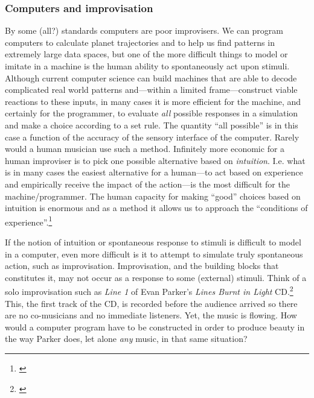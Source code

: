 \subsubsection*{Computers and improvisation}
\label{sec:comp-as-impr}

By some (all?) standards computers are poor improvisers. We can
program computers to calculate planet trajectories and to help us find
patterns in extremely large data spaces, but one of the more difficult
things to model or imitate in a machine is the human ability to
spontaneously act upon stimuli. Although current computer science can
build machines that are able to decode complicated real world patterns
and---within a limited frame---construct viable reactions to these
inputs, in many cases it is more efficient for the machine, and
certainly for the programmer, to evaluate \emph{all} possible
responses in a simulation and make a choice according to a set
rule. The quantity ``all possible'' is in this case a function of the
accuracy of the sensory interface of the computer. Rarely would a
human musician use such a method. Infinitely more economic for a human
improviser is to pick one possible alternative based on
\emph{intuition}. I.e. what is in many cases the easiest alternative
for a human---to act based on experience and empirically receive the
impact of the action---is the most difficult for the
machine/programmer. The human capacity for making ``good'' choices
based on intuition is enormous and as a method it allows us to
approach the ``conditions of experience''.\footnote{\citet[p. 27]{deleuze88}}

If the notion of intuition or spontaneous response to stimuli is
difficult to model in a computer, even more difficult is it to attempt
to simulate truly spontaneous action, such as
improvisation. Improvisation, and the building blocks that constitutes
it, may not occur as a response to some (external) stimuli. Think of a
solo improvisation such as \emph{Line 1} of Evan Parker's
\emph{Lines Burnt in Light} CD.\footnote{\citet{parker01}} This, the first
track of the CD, is recorded before the audience arrived so there are
no co-musicians and no immediate listeners. Yet, the music is
flowing. How would a computer program have to be constructed in order
to produce beauty in the way Parker does, let alone \emph{any} music,
in that same situation?

